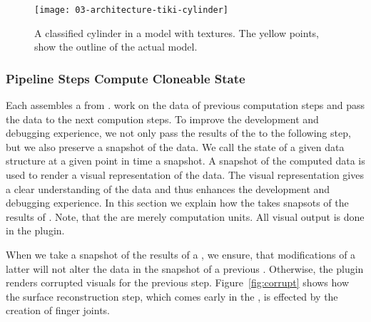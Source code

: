 \documentclass[../03-Architecture.tex]{subfiles}
\begin{document}
\begin{figure}[h]
  \centering
  \texttt{[image: 03-architecture-tiki-cylinder]}
  \caption{A classified cylinder in a model with textures.
    The yellow points, show the outline of the actual model.}
  \label{fig:tiki-cylinder}
\end{figure}

\paragraph{}


\subsubsection{Pipeline Steps Compute Cloneable State}

Each \class{\fabmethod} assembles a  from
.  work on the
data of previous computation steps and pass the data to the
next compution steps. To improve the development and
debugging experience, we not only pass the results of the
 to the following step, but we also
preserve a snapshot of the data. We call the state of a
given data structure at a given point in time a snapshot. A
snapshot of the computed data is used to render a visual
representation of the data. The visual representation gives
a clear understanding of the data and thus enhances the
development and debugging experience. In this section we
explain how the  takes snapsots of the
results of . Note, that the
 are merely computation units. All
visual output is done in the  plugin.

When we take a snapshot of the results of a
, we ensure, that modifications of a
latter  will not alter the data in the
snapshot of a previous . Otherwise, the
 plugin renders corrupted visuals for
the previous step. Figure~\ref{fig:corrupt} shows how the surface
reconstruction step, which comes early in the
, is effected by the creation of finger
joints.
\end{document}
